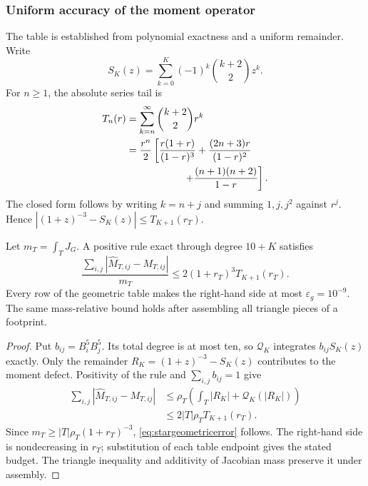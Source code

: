 \subsubsection{Uniform accuracy of the moment operator}
The table is established from polynomial exactness and a uniform remainder.
Write
\begin{equation}
 S_K(z)=\sum_{k=0}^K(-1)^k\binom{k+2}{2}z^k.
\end{equation}
For $n\geq1$, the absolute series tail is
\begin{align}
 T_n(r)&=\sum_{k=n}^\infty\binom{k+2}{2}r^k\nonumber\\
 &=\frac{r^n}{2}\left[
 \frac{r(1+r)}{(1-r)^3}+\frac{(2n+3)r}{(1-r)^2}\right.\nonumber\\
 &\hspace{20mm}\left.+\frac{(n+1)(n+2)}{1-r}\right].
 \label{eq:starwarptail}
\end{align}
The closed form follows by writing $k=n+j$ and summing $1,j,j^2$ against
$r^j$. Hence $|(1+z)^{-3}-S_K(z)|\leq T_{K+1}(r_T)$.

\begin{theorem}
Let $m_T=\int_TJ_G$. A positive rule exact through degree $10+K$ satisfies
\begin{equation}
 \frac{\sum_{i,j}|\widehat M_{T,ij}-M_{T,ij}|}{m_T}
 \leq 2(1+r_T)^3T_{K+1}(r_T).
 \label{eq:stargeometricerror}
\end{equation}
Every row of the geometric table makes the right-hand side at most
$\varepsilon_g=10^{-9}$. The same mass-relative bound holds after assembling
all triangle pieces of a footprint.
\end{theorem}
\begin{proof}
Put $b_{ij}=B_i^5B_j^5$. Its total degree is at most ten, so
$\mathcal Q_K$ integrates $b_{ij}S_K(z)$ exactly. Only the remainder
$R_K=(1+z)^{-3}-S_K(z)$ contributes to the moment defect. Positivity of the
rule and $\sum_{i,j}b_{ij}=1$ give
\begin{align}
 \sum_{i,j}|\widehat M_{T,ij}-M_{T,ij}|
 &\leq\rho_T\left(\int_T|R_K|+
 \mathcal Q_K(|R_K|)\right)\nonumber\\
 &\leq2|T|\rho_TT_{K+1}(r_T).
\end{align}
Since $m_T\geq|T|\rho_T(1+r_T)^{-3}$,
\eqref{eq:stargeometricerror} follows. The right-hand side is nondecreasing
in $r_T$; substitution of each table endpoint gives the stated budget.
The triangle inequality and additivity of Jacobian mass preserve it under
assembly.
\end{proof}

